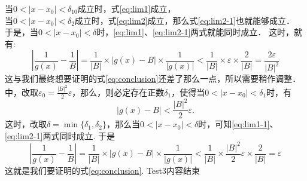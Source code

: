 当$0<|x-x_0|<\delta_{10}$成立时，式\eqref{eq:lim1}成立，\\
当$0<|x-x_0|<\delta_2$成立时，式\eqref{eq:lim2}成立，那么式\eqref{eq:lim2-1}也就能够成立．\\
于是，当$0<|x-x_0|<\delta$时，\eqref{eq:lim1}、\eqref{eq:lim2-1}两式就能同时成立．
这时，就有:
        \begin{equation}
            \left|\frac{1}{g(x)}-\frac{1}{B}\right|=\frac{1}{|B|}\times|g(x)-B|\times\frac{1}{|g(x)|}
            <\frac{1}{|B|}\times \varepsilon \times \frac{2}{|B|}=\frac{2\varepsilon}{|B|^2}
        \end{equation}
这与我们最终想要证明的式\eqref{eq:conclusion}还差了那么一点，所以需要稍作调整．\\
中，改取$\varepsilon_0=\frac{|B|^2}{2}\varepsilon$，那么，则必定存在正数$\delta_1$，使得当$0<|x-x_0|<\delta_1$时，有
\begin{equation}
    |g(x)-B|<\frac{|B|^2}{2}\varepsilon.
\end{equation}
这时，改取$\delta=\min\{\delta_{1},\delta_2\}$，那么当$0<|x-x_0|<\delta$时，可知\eqref{eq:lim1-1}、\eqref{eq:lim2-1}两式同时成立.
于是
\begin{equation}
    \left|\frac{1}{g(x)}-\frac{1}{B}\right|=\frac{1}{|B|}\times|g(x)-B|\times\frac{1}{|g(x)|}
    <\frac{1}{|B|}\times \frac{|B|^2}{2}\varepsilon \times \frac{2}{|B|}=\varepsilon
\end{equation}
这就是我们要证明的式\eqref{eq:conclusion}.
Test3内容结束



